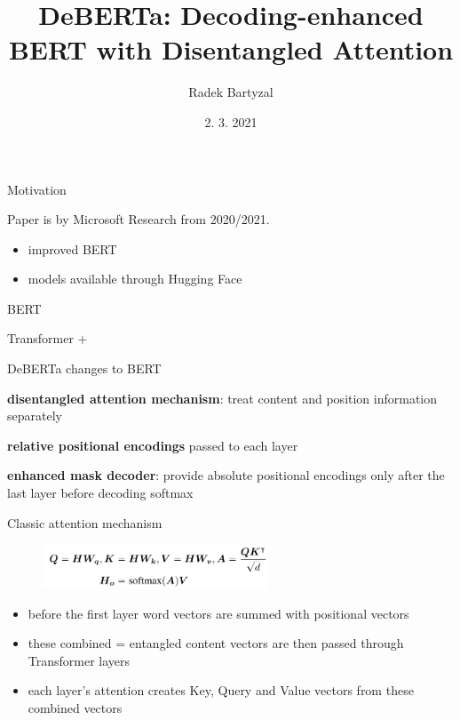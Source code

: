 \documentclass{beamer}
\begin{document}
\title[DeBERTa]{DeBERTa: Decoding-enhanced BERT with Disentangled Attention}  
\author{Radek Bartyzal}
\date{2. 3. 2021} 

\frame{\titlepage} 

\begin{frame}{Motivation}

Paper is by Microsoft Research from 2020/2021.
\vfill

\begin{itemize}
\item improved BERT
\item models available through Hugging Face
\end{itemize}


\end{frame}
\begin{frame}{BERT}

Transformer + 

\end{frame}
\begin{frame}{DeBERTa changes to BERT}


\textbf{disentangled attention mechanism}: treat content and position information separately

\vfill

\textbf{relative positional encodings} passed to each layer

\vfill

\textbf{enhanced mask decoder}: provide absolute positional encodings only after the last layer before decoding softmax

\end{frame}
\begin{frame}{Classic attention mechanism}


\begin{figure}[h]
\includegraphics[width=0.6\textwidth]{img/att}
\end{figure}

\begin{itemize}
\item before the first layer word vectors are summed with positional vectors
\item these combined = entangled content vectors are then passed through Transformer layers
\item each layer's attention creates Key, Query and Value vectors from these combined vectors
\end{itemize}

\end{frame}
\end{document}
